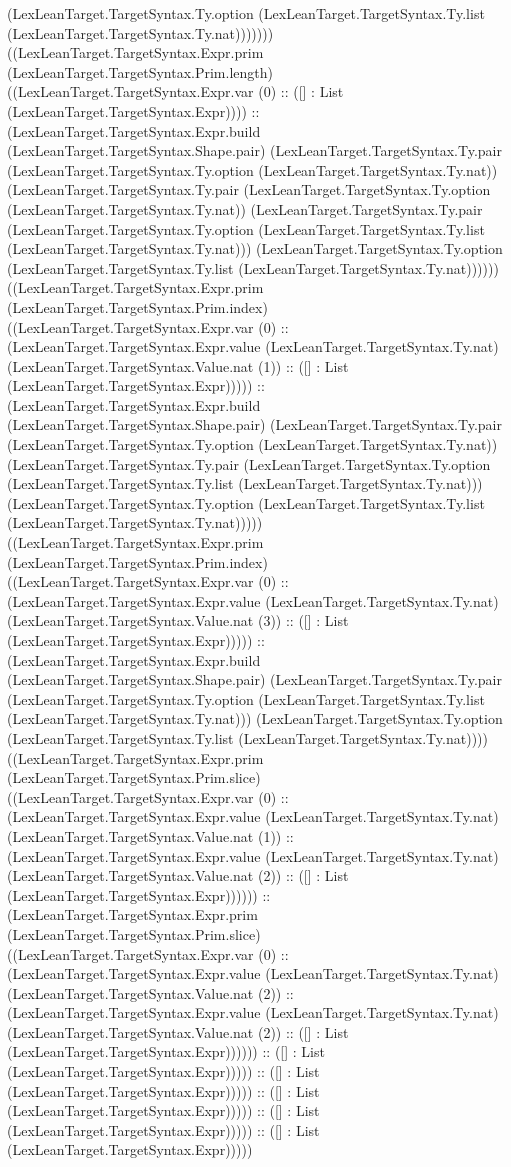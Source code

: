 \documentclass[11pt]{article}
\begin{document}
(LexLeanTarget.TargetSyntax.Ty.option (LexLeanTarget.TargetSyntax.Ty.list (LexLeanTarget.TargetSyntax.Ty.nat))))))) ((LexLeanTarget.TargetSyntax.Expr.prim (LexLeanTarget.TargetSyntax.Prim.length) ((LexLeanTarget.TargetSyntax.Expr.var (0) :: ([] : List (LexLeanTarget.TargetSyntax.Expr)))) :: (LexLeanTarget.TargetSyntax.Expr.build (LexLeanTarget.TargetSyntax.Shape.pair) (LexLeanTarget.TargetSyntax.Ty.pair (LexLeanTarget.TargetSyntax.Ty.option (LexLeanTarget.TargetSyntax.Ty.nat)) (LexLeanTarget.TargetSyntax.Ty.pair (LexLeanTarget.TargetSyntax.Ty.option (LexLeanTarget.TargetSyntax.Ty.nat)) (LexLeanTarget.TargetSyntax.Ty.pair (LexLeanTarget.TargetSyntax.Ty.option (LexLeanTarget.TargetSyntax.Ty.list (LexLeanTarget.TargetSyntax.Ty.nat))) (LexLeanTarget.TargetSyntax.Ty.option (LexLeanTarget.TargetSyntax.Ty.list (LexLeanTarget.TargetSyntax.Ty.nat)))))) ((LexLeanTarget.TargetSyntax.Expr.prim (LexLeanTarget.TargetSyntax.Prim.index) ((LexLeanTarget.TargetSyntax.Expr.var (0) :: (LexLeanTarget.TargetSyntax.Expr.value (LexLeanTarget.TargetSyntax.Ty.nat) (LexLeanTarget.TargetSyntax.Value.nat (1)) :: ([] : List (LexLeanTarget.TargetSyntax.Expr))))) :: (LexLeanTarget.TargetSyntax.Expr.build (LexLeanTarget.TargetSyntax.Shape.pair) (LexLeanTarget.TargetSyntax.Ty.pair (LexLeanTarget.TargetSyntax.Ty.option (LexLeanTarget.TargetSyntax.Ty.nat)) (LexLeanTarget.TargetSyntax.Ty.pair (LexLeanTarget.TargetSyntax.Ty.option (LexLeanTarget.TargetSyntax.Ty.list (LexLeanTarget.TargetSyntax.Ty.nat))) (LexLeanTarget.TargetSyntax.Ty.option (LexLeanTarget.TargetSyntax.Ty.list (LexLeanTarget.TargetSyntax.Ty.nat))))) ((LexLeanTarget.TargetSyntax.Expr.prim (LexLeanTarget.TargetSyntax.Prim.index) ((LexLeanTarget.TargetSyntax.Expr.var (0) :: (LexLeanTarget.TargetSyntax.Expr.value (LexLeanTarget.TargetSyntax.Ty.nat) (LexLeanTarget.TargetSyntax.Value.nat (3)) :: ([] : List (LexLeanTarget.TargetSyntax.Expr))))) :: (LexLeanTarget.TargetSyntax.Expr.build (LexLeanTarget.TargetSyntax.Shape.pair) (LexLeanTarget.TargetSyntax.Ty.pair (LexLeanTarget.TargetSyntax.Ty.option (LexLeanTarget.TargetSyntax.Ty.list (LexLeanTarget.TargetSyntax.Ty.nat))) (LexLeanTarget.TargetSyntax.Ty.option (LexLeanTarget.TargetSyntax.Ty.list (LexLeanTarget.TargetSyntax.Ty.nat)))) ((LexLeanTarget.TargetSyntax.Expr.prim (LexLeanTarget.TargetSyntax.Prim.slice) ((LexLeanTarget.TargetSyntax.Expr.var (0) :: (LexLeanTarget.TargetSyntax.Expr.value (LexLeanTarget.TargetSyntax.Ty.nat) (LexLeanTarget.TargetSyntax.Value.nat (1)) :: (LexLeanTarget.TargetSyntax.Expr.value (LexLeanTarget.TargetSyntax.Ty.nat) (LexLeanTarget.TargetSyntax.Value.nat (2)) :: ([] : List (LexLeanTarget.TargetSyntax.Expr)))))) :: (LexLeanTarget.TargetSyntax.Expr.prim (LexLeanTarget.TargetSyntax.Prim.slice) ((LexLeanTarget.TargetSyntax.Expr.var (0) :: (LexLeanTarget.TargetSyntax.Expr.value (LexLeanTarget.TargetSyntax.Ty.nat) (LexLeanTarget.TargetSyntax.Value.nat (2)) :: (LexLeanTarget.TargetSyntax.Expr.value (LexLeanTarget.TargetSyntax.Ty.nat) (LexLeanTarget.TargetSyntax.Value.nat (2)) :: ([] : List (LexLeanTarget.TargetSyntax.Expr)))))) :: ([] : List (LexLeanTarget.TargetSyntax.Expr))))) :: ([] : List (LexLeanTarget.TargetSyntax.Expr))))) :: ([] : List (LexLeanTarget.TargetSyntax.Expr))))) :: ([] : List (LexLeanTarget.TargetSyntax.Expr))))) :: ([] : List (LexLeanTarget.TargetSyntax.Expr))))) 
\end{document}
